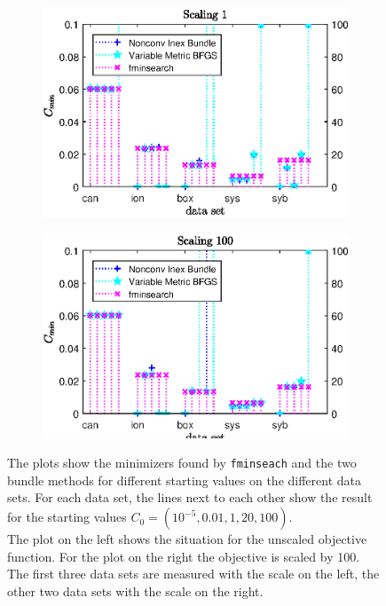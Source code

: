 \begin{figure}[ht]
	\begin{subfigure}{0.49\textwidth}
		\includegraphics[width=\textwidth]{Pictures/Plots/Scal1_ll-15C.eps}%
	\end{subfigure}%
	\hfill
	\begin{subfigure}{0.49\textwidth}
		\includegraphics[width=\textwidth]{Pictures/Plots/Scal100_ll-15C.eps}%
	\end{subfigure}
	\caption[Minimizers for different starting values and scalings]{The plots show the minimizers found by \textup{\texttt{fminseach}} and the two bundle methods for different starting values on the different data sets. For each data set, the lines next to each other show the result for the starting values \(C_0 = (10^{-5},0.01,1,20,100)\).\\
	The plot on the left shows the situation for the unscaled objective function. For the plot on the right the objective is scaled by 100.\\
	The first three data sets are measured with the scale on the left, the other two data sets with the scale on the right.}%
	\label{fig_ll15_sc1100_C}%
\end{figure}

